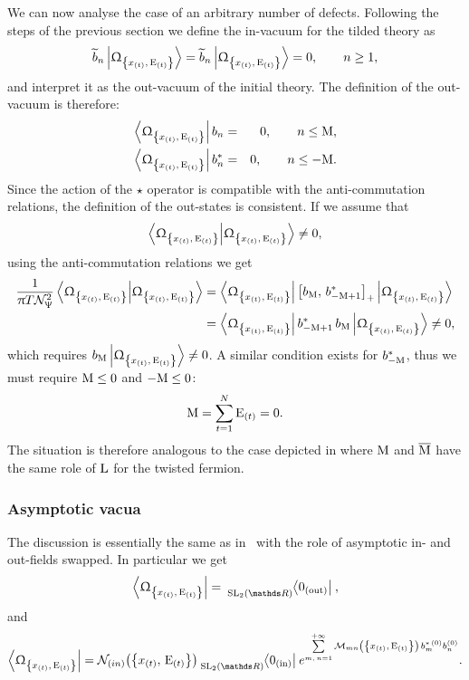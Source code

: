 We can now analyse the case of an arbitrary number of defects.
Following the steps of the previous section we define the in-vacuum for the tilded theory as
\begin{equation}
  \tildeb_n \GGexcvacket
  = 
  \tildeb_n \GGexcvacket
  = 0,
  \qquad
  n \ge 1,
\end{equation}
and interpret it as the out-vacuum of the initial theory.     
The definition of the out-vacuum is therefore:
\begin{eqnarray}
  \GGexcvacbra b_n & = & 0,
  \qquad n \le \rM,
  \\
  \GGexcvacbra b^*_n & = & 0,
  \qquad n \le -\rM.
\end{eqnarray}
Since the action of the $\star$ operator is compatible with the anti-commutation relations, the definition of the out-states is consistent.
If we assume that
\begin{equation}
  \braket{\GGexcvac}{\GGexcvac} \neq 0,
\end{equation}
using the anti-commutation relations we get
\begin{equation}
  \begin{split}
    \frac{1}{\pi T \cN_{\Psi}^2} \braket{\GGexcvac}{\GGexcvac}
    & =
    \GGexcvacbra
    \liebraket{b_{\rM}}{b_{-\rM+1}^*}_+
    \GGexcvacket
    \\
    & =
    \GGexcvacbra
    b_{-\rM+1}^*\,  b_{\rM}
    \GGexcvacket
    \neq 0,
  \end{split}
\end{equation}
which requires $b_{\rM} \GGexcvacket \neq 0$.
A similar condition exists for $b^*_{-\mathrm{M}}$, thus we must require $\mathrm{M} \le 0$ and $-\mathrm{M} \le 0$:
\begin{equation}
 \mathrm{M} =\sum\limits_{t = 1}^{N} \mathrm{E}_{(t)} = 0.
\end{equation}
The situation is therefore analogous to the case depicted in  where $\mathrm{M}$ and $\overline{\mathrm{M}}$ have the same role of $\mathrm{L}$ for the twisted fermion.


\subsubsection{Asymptotic vacua}

The discussion is essentially the same as in~ with the role of asymptotic in- and out-fields swapped.
In particular we get
\begin{equation}
  \GGexcvacbra = \regvacuumoutconj,
\end{equation}
and
\begin{equation}
  \GGexcvacbra
  =
  \cN_{(in)}\qty(\qty{x_{(t)},\, \rE_{(t)}}) \regvacuuminconj
  e^{%
    \finitesum{m,\, n}{1}{+\infty}
    \cM_{m n}\qty(\qty{x_{(t)},\, \rE_{(t)}})\,
    b^{*\, (0)}_m b^{(0)}_n
  }.
\end{equation}


